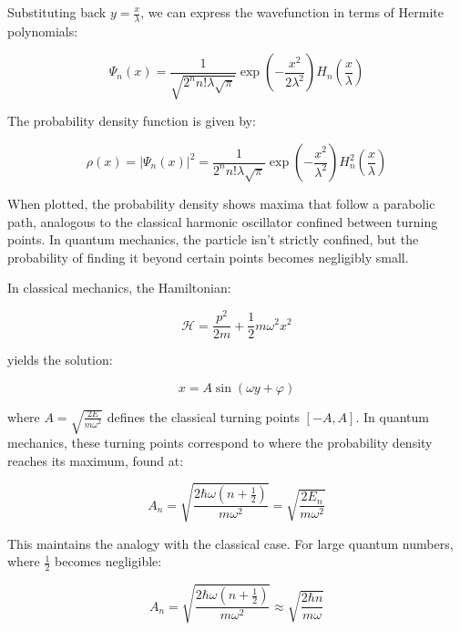 \documentclass[italian]{HKNdocument}
\begin{document}
Substituting back $y=\frac{x}{\lambda}$, we can express the wavefunction in terms of Hermite polynomials:

\begin{equation}
\Psi_n(x) = \frac{1}{\sqrt{2^n n!\lambda\sqrt{\pi}}}\exp\left(-\frac{x^2}{2\lambda^2}\right)H_n\left(\frac{x}{\lambda}\right) \label{eq:5.53}
\end{equation}

The probability density function is given by:

\begin{equation}
\rho(x) = |\Psi_n(x)|^2 = \frac{1}{2^n n!\lambda\sqrt{\pi}}\exp\left(-\frac{x^2}{\lambda^2}\right)H_n^2\left(\frac{x}{\lambda}\right) \label{eq:5.54}
\end{equation}

When plotted, the probability density shows maxima that follow a parabolic path, analogous to the classical harmonic oscillator confined between turning points. In quantum mechanics, the particle isn't strictly confined, but the probability of finding it beyond certain points becomes negligibly small.

In classical mechanics, the Hamiltonian:

\begin{equation}
\mathcal{H} = \frac{p^2}{2m} + \frac{1}{2}m\omega^2 x^2 \label{eq:5.55}
\end{equation}

yields the solution:

\begin{equation}
x = A\sin(\omega y + \varphi) \label{eq:5.56}
\end{equation}

where $A = \sqrt{\frac{2E}{m\omega^2}}$ defines the classical turning points $[-A,A]$. In quantum mechanics, these turning points correspond to where the probability density reaches its maximum, found at:

\begin{equation}
A_n = \sqrt{\frac{2\hbar\omega(n+\frac{1}{2})}{m\omega^2}} = \sqrt{\frac{2E_n}{m\omega^2}} \label{eq:5.57}
\end{equation}

This maintains the analogy with the classical case. For large quantum numbers, where $\frac{1}{2}$ becomes negligible:

\begin{equation}
A_n = \sqrt{\frac{2\hbar\omega(n+\frac{1}{2})}{m\omega^2}} \approx \sqrt{\frac{2\hbar n}{m\omega}} \label{eq:5.58}
\end{equation}
\end{document}
